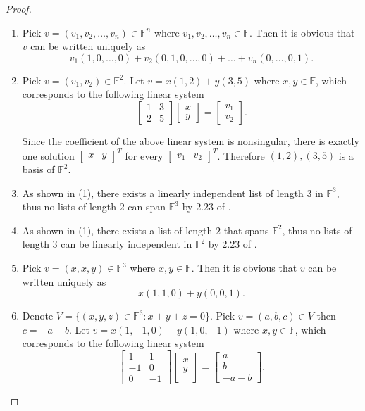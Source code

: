 \begin{proof}
\begin{enumerate}[label=(\alph*)]
\item Pick $v=(v_1,v_2,\dots,v_n)\in\mathbb{F}^n$ where $v_1,v_2,\dots,v_n\in\mathbb{F}$. Then it is obvious that $v$ can be written uniquely as\[
v_1(1,0,\dots,0)+v_2(0,1,0,\dots,0)+\dots+v_n(0,\dots,0,1).
\]
\item Pick $v=(v_1,v_2)\in\mathbb{F}^2$. Let $v=x(1, 2)+y(3,5)$ where $x,y\in\mathbb{F}$, which corresponds to the following linear system\[
\begin{bmatrix}
1&3\\
2&5
\end{bmatrix}
\begin{bmatrix}
x\\
y
\end{bmatrix}
=
\begin{bmatrix}
v_1\\
v_2
\end{bmatrix}.
\]

Since the coefficient of the above linear system is nonsingular, there is exactly one solution $\begin{bmatrix}x&y\end{bmatrix}^T$ for every $\begin{bmatrix}v_1&v_2\end{bmatrix}^T$. Therefore $(1,2),(3,5)$ is a basis of $\mathbb{F}^2$.
\item As shown in (1), there exists a linearly independent list of length $3$ in $\mathbb{F}^3$, thus no lists of length $2$ can span $\mathbb{F}^3$ by 2.23 of \cite{axler2014linear}.
\item As shown in (1), there exists a list of length $2$ that spans $\mathbb{F}^2$, thus no lists of length $3$ can be linearly independent in $\mathbb{F}^2$ by 2.23 of \cite{axler2014linear}.
\item Pick $v=(x,x,y)\in\mathbb{F}^3$ where $x,y\in\mathbb{F}$. Then it is obvious that $v$ can be written uniquely as\[
x(1,1,0)+y(0,0,1).
\]
\item Denote $V=\{(x,y,z)\in\mathbb{F}^3: x+y+z=0\}$. Pick $v=(a,b,c)\in V$ then $c=-a-b$. Let $v=x(1,-1,0)+y(1,0,-1)$ where $x,y\in\mathbb{F}$, which corresponds to the following linear system\[
\begin{bmatrix}
1&1\\
-1&0\\
0&-1
\end{bmatrix}
\begin{bmatrix}
x\\
y\\
\end{bmatrix}
=
\begin{bmatrix}
a\\
b\\
-a-b
\end{bmatrix}.
\]


\end{enumerate}
\end{proof}
